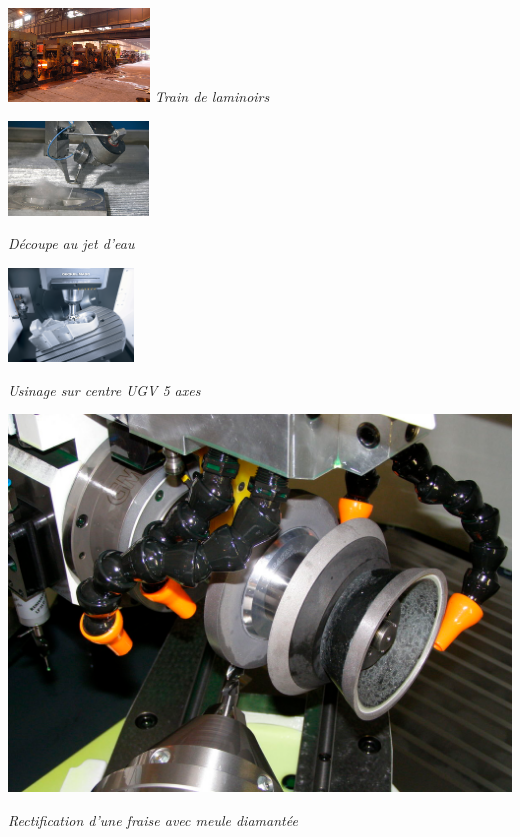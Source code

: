 \documentclass[11pt,oneside]{article}
\begin{document}
\begin{minipage}[c]{.2\linewidth}
\begin{center}
\includegraphics[height=2.5cm]{png/laminoirs}
\textit{Train de laminoirs}
\end{center}
\end{minipage} \hfill
\begin{minipage}[c]{.2\linewidth}
\begin{center}
\includegraphics[height=2.5cm]{png/jetdeau}

\textit{Découpe au jet d'eau}
\end{center}
\end{minipage} \hfill
\begin{minipage}[c]{.2\linewidth}
\begin{center}
\includegraphics[height=2.5cm]{png/5axes}

\textit{Usinage sur centre UGV 5 axes}
\end{center}
\end{minipage} \hfill
\begin{minipage}[c]{.2\linewidth}
\begin{center}
\includegraphics[width=.9\textwidth]{png/rectif.png}

\textit{Rectification d'une fraise avec meule diamantée}
\end{center}
\end{minipage}
\end{document}
